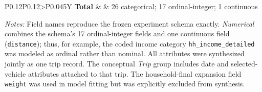 \begin{table}[!htbp]
\begin{tabularx}{\textwidth}{P{0.12\textwidth}P{0.12\textwidth}>{\centering\arraybackslash}P{0.045\textwidth}Y}
\textbf{Total}
& 
& 26 categorical; 17 ordinal-integer; 1 continuous \\
\bottomrule
\end{tabularx}
\vspace{2pt}

\begin{minipage}{\textwidth}
\scriptsize
\textit{Notes:} Field names reproduce the frozen experiment schema exactly.
\textit{Numerical} combines the schema's 17 ordinal-integer fields and one
continuous field (\texttt{distance}); thus, for example, the coded income
category \texttt{hh\_income\_detailed} was modeled as ordinal rather than
nominal. All attributes were synthesized jointly as one trip record. The
conceptual \textit{Trip} group includes date and selected-vehicle attributes
attached to that trip. The household-final expansion field \texttt{weight}
was used in model fitting but was explicitly excluded from synthesis.
\end{minipage}
\end{table}
